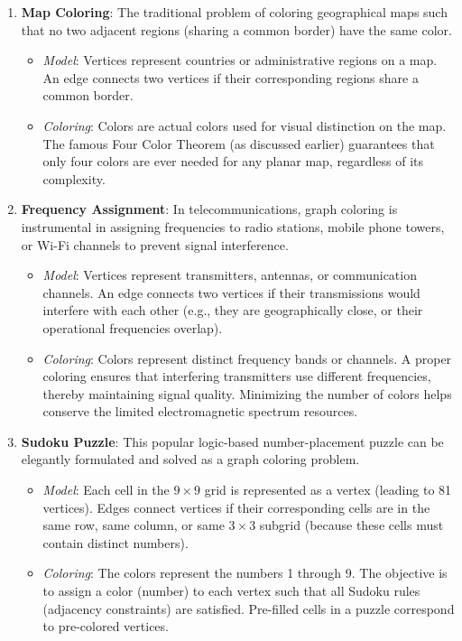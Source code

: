 \documentclass[11pt, a4paper]{article}
\begin{document}
\begin{enumerate}[noitemsep,topsep=3pt,parsep=3pt,partopsep=0pt]
\begin{itemize}
    \end{itemize}
    \item \textbf{Map Coloring}: The traditional problem of coloring geographical maps such that no two adjacent regions (sharing a common border) have the same color.
    \begin{itemize}
        \item \textit{Model}: Vertices represent countries or administrative regions on a map. An edge connects two vertices if their corresponding regions share a common border.
        \item \textit{Coloring}: Colors are actual colors used for visual distinction on the map. The famous Four Color Theorem (as discussed earlier) guarantees that only four colors are ever needed for any planar map, regardless of its complexity.
    \end{itemize}
    \item \textbf{Frequency Assignment}: In telecommunications, graph coloring is instrumental in assigning frequencies to radio stations, mobile phone towers, or Wi-Fi channels to prevent signal interference.
    \begin{itemize}
        \item \textit{Model}: Vertices represent transmitters, antennas, or communication channels. An edge connects two vertices if their transmissions would interfere with each other (e.g., they are geographically close, or their operational frequencies overlap).
        \item \textit{Coloring}: Colors represent distinct frequency bands or channels. A proper coloring ensures that interfering transmitters use different frequencies, thereby maintaining signal quality. Minimizing the number of colors helps conserve the limited electromagnetic spectrum resources.
    \end{itemize}
    \item \textbf{Sudoku Puzzle}: This popular logic-based number-placement puzzle can be elegantly formulated and solved as a graph coloring problem.
    \begin{itemize}
        \item \textit{Model}: Each cell in the $9 \times 9$ grid is represented as a vertex (leading to 81 vertices). Edges connect vertices if their corresponding cells are in the same row, same column, or same $3 \times 3$ subgrid (because these cells must contain distinct numbers).
        \item \textit{Coloring}: The colors represent the numbers 1 through 9. The objective is to assign a color (number) to each vertex such that all Sudoku rules (adjacency constraints) are satisfied. Pre-filled cells in a puzzle correspond to pre-colored vertices.

\end{itemize}
\end{enumerate}
\end{document}
